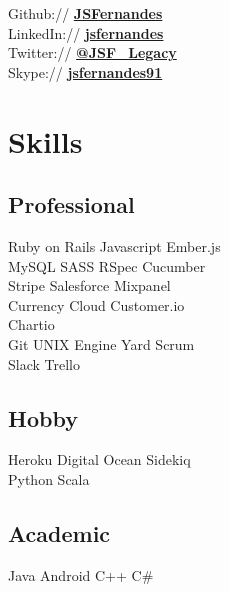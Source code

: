 \documentclass[letterpaper]{deedy-resume} %
\begin{document}
\begin{minipage}[t]{0.3\textwidth}
Github:// \href{https://github.com/JSFernandes}{\bf JSFernandes} \\
LinkedIn:// \href{https://www.linkedin.com/in/jsfernandes}{\bf jsfernandes} \\
Twitter:// \href{https://twitter.com/JSF_Legacy}{\bf @JSF\_Legacy} \\
Skype:// \href{skype:jsfernandes91?call}{\bf jsfernandes91}

\sectionspace %


\section{Skills}

\subsection{Professional}

Ruby on Rails \textbullet{} Javascript \textbullet{} Ember.js \\
MySQL \textbullet{} SASS \textbullet{} RSpec \textbullet{} Cucumber \\

Stripe \textbullet{} Salesforce \textbullet{} Mixpanel \\
Currency Cloud \textbullet{} Customer.io \\
Chartio \\

Git \textbullet{} UNIX \textbullet{} Engine Yard \textbullet{} Scrum \\
Slack \textbullet{} Trello \\

\sectionspace

\subsection{Hobby}
Heroku \textbullet{} Digital Ocean \textbullet{} Sidekiq \\
Python \textbullet{} Scala \\

\sectionspace

\subsection{Academic}
Java \textbullet{} Android \textbullet{} C++ \textbullet{} C\# \\


\end{minipage}
\end{document}
